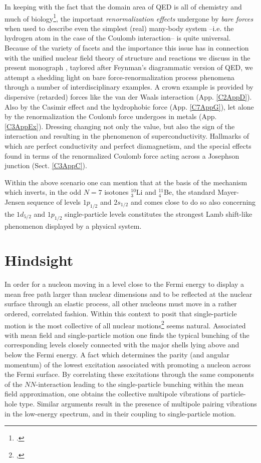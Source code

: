 In keeping with the fact that the domain area of QED is all of chemistry and much of biology\footnote{\cite{Feynman:06}.}, the important \textit{renormalization effects} undergone by \textit{bare forces} when used to describe even the simplest (real) many-body system --i.e. the hydrogen atom in the case of the Coulomb interaction-- is quite universal. Because of the variety of facets and the importance this issue has in connection with the unified nuclear field theory of structure and reactions we discuss in the present monograph , taylored after Feynman's diagrammatic version of QED, we attempt a shedding light on bare force-renormalization process phenomena through a number of interdisciplinary examples. A crown example is provided by dispersive (retarded) forces like the van der Waals interaction (App. \ref{C2AppD}). Also by the Casimir effect and the hydrophobic force (App. \ref{C7AppG}), let alone by the renormalization the Coulomb force undergoes in metals (App. \ref{C3AppEx}). Dressing changing not only the value, but also the sign of the interaction and resulting in the phenomenon of superconductivity. Hallmarks of which are perfect conductivity and perfect diamagnetism, and the special effects found in terms of the renormalized Coulomb force acting across a Josephson junction (Sect. \ref{C3AppC}). 


Within the above scenario one can mention that at the basis of the mechanism which inverts, in the odd $N=7$ isotones $^{10}_3$Li and $^{11}_4$Be, the standard Mayer-Jensen sequence of levels $1p_{1/2}$ and $2s_{1/2}$ and comes close to do so also concerning the $1d_{5/2}$ and $1p_{1/2}$ single-particle levels constitutes the strongest Lamb shift-like phenomenon displayed by a physical system.
\section{Hindsight}\label{Sect1.10}
In order for a nucleon moving in a level close to the Fermi energy to display a mean free path larger than nuclear dimensions and to be reflected at the nuclear surface through an elastic process, all other nucleons must move in a rather ordered, correlated fashion. Within this context to posit that single-particle motion is the most collective of all nuclear motions\footnote{\cite{Mottelson:62},} seems natural. Associated with mean field and single-particle motion one finds the typical bunching of the corresponding levels closely connected with the major shells lying above and below the Fermi energy. A fact which determines the parity (and angular momentum) of the lowest excitation associated with promoting  a nucleon across the Fermi surface.  By correlating these excitations through the same components of the $NN$-interaction leading to the single-particle bunching within the mean field approximation, one obtains the collective multipole  vibrations of particle-hole type. Similar arguments result in the presence of multipole pairing vibrations in the low-energy spectrum, and in their coupling to single-particle motion.

